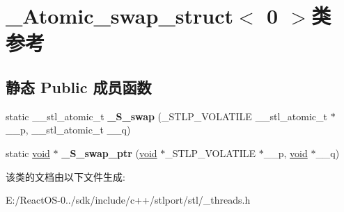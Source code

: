 \hypertarget{class___atomic__swap__struct_3_010_01_4}{}\section{\+\_\+\+Atomic\+\_\+swap\+\_\+struct$<$ 0 $>$类 参考}
\label{class___atomic__swap__struct_3_010_01_4}
\subsection*{静态 Public 成员函数}
\begin{DoxyCompactItemize}
\item 
\mbox{\label{class___atomic__swap__struct_3_010_01_4_a880a9171fdcddab2039e69008b398365}} 
static \+\_\+\+\_\+stl\+\_\+atomic\+\_\+t {\bfseries \+\_\+\+S\+\_\+swap} (\+\_\+\+S\+T\+L\+P\+\_\+\+V\+O\+L\+A\+T\+I\+LE \+\_\+\+\_\+stl\+\_\+atomic\+\_\+t $\ast$\+\_\+\+\_\+p, \+\_\+\+\_\+stl\+\_\+atomic\+\_\+t \+\_\+\+\_\+q)
\item 
\mbox{\label{class___atomic__swap__struct_3_010_01_4_a8f3b11475266a36cb1447d45b2df0dca}} 
static \hyperlink{interfacevoid}{void} $\ast$ {\bfseries \+\_\+\+S\+\_\+swap\+\_\+ptr} (\hyperlink{interfacevoid}{void} $\ast$\+\_\+\+S\+T\+L\+P\+\_\+\+V\+O\+L\+A\+T\+I\+LE $\ast$\+\_\+\+\_\+p, \hyperlink{interfacevoid}{void} $\ast$\+\_\+\+\_\+q)
\end{DoxyCompactItemize}


该类的文档由以下文件生成\+:\begin{DoxyCompactItemize}
\item 
E\+:/\+React\+O\+S-\/0../sdk/include/c++/stlport/stl/\+\_\+threads.\+h\end{DoxyCompactItemize}
